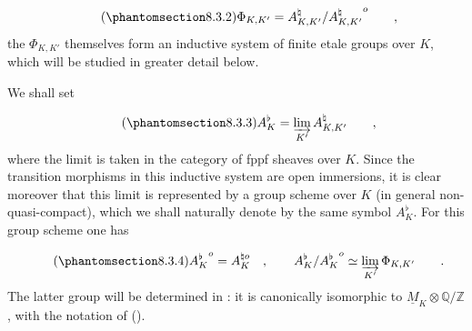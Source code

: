 \begin{equation}\tag{\SGARefTarget{sga7.sga7i.eix.n8-3-2}{8.3.2}}
\Phi_{K,K'}=A^{\natural}_{K,K'}
 /{A^{\natural}_{K,K'}}^{o} \qquad ,
\end{equation}
the $\Phi_{K,K'}$ themselves form an inductive system of finite
etale groups over $K$, which will be studied in greater detail
below.

We shall set

\begin{equation}\tag{\SGARefTarget{sga7.sga7i.eix.n8-3-3}{8.3.3}}
A^{\flat}_{K}=\varinjlim_{K'} A^{\natural}_{K,K'} \qquad ,
\end{equation}
where the limit is taken in the category of fppf sheaves over $K$.
Since the transition morphisms in this inductive system are open
immersions, it is clear moreover that this limit is represented by
a group scheme over $K$ (in general non-quasi-compact), which we
shall naturally denote by the same symbol $A^{\flat}_{K}$. For this
group scheme one has

\begin{equation}\tag{\SGARefTarget{sga7.sga7i.eix.n8-3-4}{8.3.4}}
{A_{K}^{\flat}}^{o}=A_{K}^{\natural o} \quad , \qquad
A^{\flat}_{K}/{A_{K}^{\flat}}^{o}
 \simeq \varinjlim_{K'}\Phi_{K,K'} \qquad .
\end{equation}
The latter group will be determined in : it is canonically
isomorphic to $\underline{M}_{K}\otimes\mathbb{Q}/\mathbb{Z}$, with
the notation of ().
